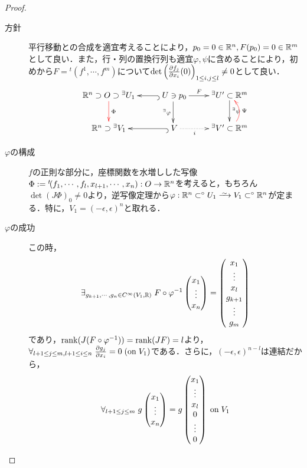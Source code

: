 \documentclass[uplatex,dvipdfmx]{jsreport}
\begin{document}
\begin{proof}\mbox{}
    \begin{description}
        \item[方針] 平行移動との合成を適宜考えることにより，$p_0=0\in\mathbb{R}^n,F(p_0)=0\in\mathbb{R}^m$として良い．また，行・列の置換行列も適宜$\varphi,\psi$に含めることにより，初めから$F={}^t\!(f^1,\cdots,f^m)$について$\det\left(\frac{\partial f_j}{\partial x_i}(0)\right)_{1\le i,j\le l}\ne 0$として良い．
        \[\xymatrix{
            \R^n\supset O\supset{}^\exists U_1 \ar@[red][d]^-{\Phi} & \ar@{^{(}->}[l]\; U \ni p_0\ar[r]^-{F}\ar[d]_-{{}^\exists\varphi}&{}^\exists U'\subset\R^m\ar[d]^-{{}^\exists\psi}\\
            \R^n\supset{}^\exists V_1 & \ar@{^{(}->}[l]\; V \ar@{.>}[r]_-{i}&{}^\exists V'\subset\R^m\ar@/_1pc/@[red][u]_-{\Psi}
        }\]
        \item[$\varphi$の構成] 
        $f$の正則な部分に，座標関数を水増しした写像$\Phi:={}^t\!(f_1,\cdots,f_l,x_{l+1},\cdots,x_n):O\to\mathbb{R}^n$を考えると，もちろん$\det(J\Phi)_0\ne 0$より，逆写像定理から$\varphi:\R^n\subset^\circ U_1\iso V_1\subset^\circ\R^n$が定まる．特に，$V_1=(-\epsilon,\epsilon)^n$と取れる．
        \item[$\varphi$の成功]
        この時，
        \[\exists_{g_{k+1},\cdots,g_{n}\in C^{\infty}(V_1,\mathbb{R})}\;F\circ\varphi^{-1}\begin{pmatrix}x_1\\\vdots\\x_n\end{pmatrix}=\begin{pmatrix}x_1\\\vdots\\x_l\\g_{k+1}\\\vdots\\g_m\end{pmatrix}\]
        であり，$\mathrm{rank}(J(F\circ\varphi^{-1}))=\mathrm{rank}(JF)=l$より，$\forall_{l+1\le j\le m,l+1\le i\le n}\;\frac{\partial g_j}{\partial x_i}=0\;(\mathrm{on}\; V_1)$である．さらに，$(-\epsilon,\epsilon)^{n-l}$は連結だから，
        \[\forall_{l+1\le j\le m}\;g\begin{pmatrix}x_1\\\vdots\\x_n\end{pmatrix}=g\begin{pmatrix}x_1\\\vdots\\x_l\\0\\\vdots\\0\end{pmatrix}\;\mathrm{on}\; V_1\]

\end{description}
\end{proof}
\end{document}
